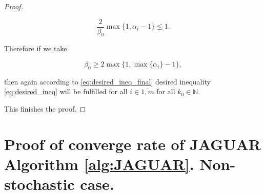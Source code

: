 \begin{proof}
\begin{enumerate}
            \begin{equation*}
                \frac{2}{\beta_0} \max\{1, \alpha_i - 1\} \leq 1.
            \end{equation*}

            Therefore if we take

            \begin{equation*}
                \beta_0 \geq 2 \max\{1, \max\{\alpha_i\} - 1\},
            \end{equation*}

            then again according to \eqref{eq:desired_ineq_final} desired inequality \eqref{eq:desired_ineq} will be fulfilled for all $i \in \overline{1, m}$ for all $k_0 \in \mathbb{N}$.
        \end{enumerate}

        This finishes the proof.
        
    \end{proof}

    \section{Proof of converge rate of JAGUAR Algorithm \ref{alg:JAGUAR}. Non-stochastic case.} \label{appendix:JAGUAR_nonstoch}

